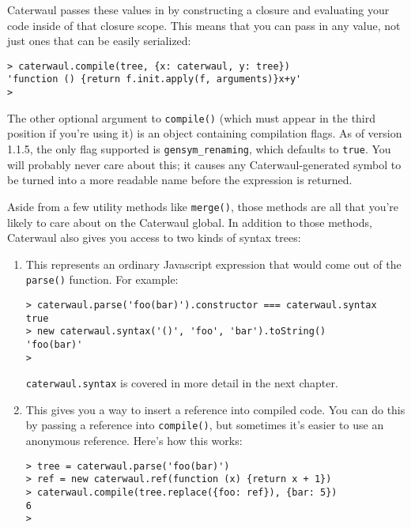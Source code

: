 \documentclass{report}
\begin{document}
\begin{enumerate}
  Caterwaul passes these values in by constructing a closure and evaluating your code inside of that closure scope. This means that you can pass in any value, not just ones that can be
  easily serialized:

\begin{verbatim}
> caterwaul.compile(tree, {x: caterwaul, y: tree})
'function () {return f.init.apply(f, arguments)}x+y'
>
\end{verbatim}

  The other optional argument to {\tt compile()} (which must appear in the third position if you're using it) is an object containing compilation flags. As of version 1.1.5, the only flag
  supported is \verb|gensym_renaming|, which defaults to {\tt true}. You will probably never care about this; it causes any Caterwaul-generated symbol to be turned into a more readable
  name before the expression is returned.
\end{enumerate}

  Aside from a few utility methods like {\tt merge()}, those methods are all that you're likely to care about on the Caterwaul global. In addition to those methods, Caterwaul also gives you
  access to two kinds of syntax trees:

\begin{enumerate}
\item[{\tt caterwaul.syntax}]
  This represents an ordinary Javascript expression that would come out of the {\tt parse()} function. For example:

\begin{verbatim}
> caterwaul.parse('foo(bar)').constructor === caterwaul.syntax
true
> new caterwaul.syntax('()', 'foo', 'bar').toString()
'foo(bar)'
>
\end{verbatim}

  {\tt caterwaul.syntax} is covered in more detail in the next chapter.

\item[{\tt caterwaul.ref}]
  This gives you a way to insert a reference into compiled code. You can do this by passing a reference into {\tt compile()}, but sometimes it's easier to use an anonymous reference.
  Here's how this works:

\begin{verbatim}
> tree = caterwaul.parse('foo(bar)')
> ref = new caterwaul.ref(function (x) {return x + 1})
> caterwaul.compile(tree.replace({foo: ref}), {bar: 5})
6
>
\end{verbatim}
\end{enumerate}
\end{document}
